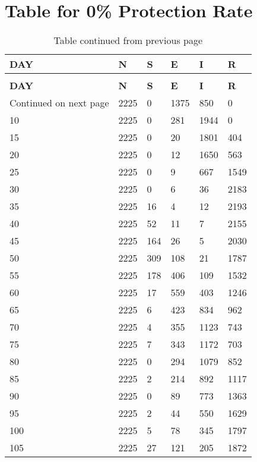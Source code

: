 \chapter{Table for 0\% Protection Rate}


\begin{longtable}{|l|l|l|l|l|l|}
	\caption{0\% Exposed Rate} \\
	
	\toprule
	\textbf{DAY} & \textbf{N} & \textbf{S} & \textbf{E }& \textbf{I} &\textbf{ R} \\
	\midrule
	\endfirsthead
	\caption*{Table continued from previous page} \\
	\toprule
	\textbf{DAY} & \textbf{N} & \textbf{S} & \textbf{E }& \textbf{I} &\textbf{ R} \\
	\midrule
	\endhead
	\midrule
	\multicolumn{1}{r}{\footnotesize Continued on next page}
	\endfoot
	\bottomrule
	\endlastfoot
		5   & 2225 & 0   & 1375 & 850  & 0   \\
		10  & 2225 & 0   & 281  & 1944 & 0   \\
		15  & 2225 & 0   & 20   & 1801 & 404 \\
		20  & 2225 & 0   & 12   & 1650 & 563 \\
		25  & 2225 & 0   & 9    & 667  & 1549\\
		30  & 2225 & 0   & 6    & 36   & 2183\\
		35  & 2225 & 16  & 4    & 12   & 2193\\
		40  & 2225 & 52  & 11   & 7    & 2155\\
		45  & 2225 & 164 & 26   & 5    & 2030\\
		50  & 2225 & 309 & 108  & 21   & 1787\\
		55  & 2225 & 178 & 406  & 109  & 1532\\
		60  & 2225 & 17  & 559  & 403  & 1246\\
		65  & 2225 & 6   & 423  & 834  & 962 \\
		70  & 2225 & 4   & 355  & 1123 & 743 \\
		75  & 2225 & 7   & 343  & 1172 & 703 \\
		80  & 2225 & 0   & 294  & 1079 & 852 \\
		85  & 2225 & 2   & 214  & 892  & 1117\\
		90  & 2225 & 0   & 89   & 773  & 1363\\
		95  & 2225 & 2   & 44   & 550  & 1629\\
		100 & 2225 & 5   & 78   & 345  & 1797\\
		105 & 2225 & 27  & 121  & 205  & 1872\\

\end{longtable}
